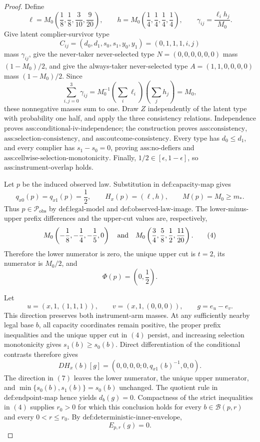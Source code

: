 \documentclass{article}
\begin{document}
\begin{proof}
Define
\[
 \ell=M_0\left(\frac18,\frac18,\frac3{10},\frac9{20}\right),
 \qquad
 h=M_0\left(\frac14,\frac14,\frac14,\frac14\right),
 \qquad
 \gamma_{ij}=\frac{\ell_i h_j}{M_0}.
\tag{1}
\]
Give latent complier-survivor type
\[
 C_{ij}=(d_0,d_1,s_0,s_1,y_0,y_1)=(0,1,1,1,i,j)
\]
mass \(\gamma_{ij}\), give the never-taker never-selected type
\(N=(0,0,0,0,0,0)\) mass \((1-M_0)/2\), and give the always-taker never-selected type \(A=(1,1,0,0,0,0)\) mass \((1-M_0)/2\).  Since
\[
 \sum_{i,j=0}^3\gamma_{ij}
 =M_0^{-1}\left(\sum_i\ell_i\right)\left(\sum_jh_j\right)=M_0,
\tag{2}
\]
these nonnegative masses sum to one.  Draw \(Z\) independently of the latent type with probability one half, and apply the three consistency relations.  Independence proves \(\text{ass:conditional-iv-independence}\); the construction proves \(\text{ass:consistency}\), \(\text{ass:selection-consistency}\), and \(\text{ass:outcome-consistency}\).  Every type has \(d_0\le d_1\), and every complier has \(s_1-s_0=0\), proving \(\text{ass:no-defiers}\) and \(\text{ass:cellwise-selection-monotonicity}\).  Finally, \(1/2\in[\epsilon,1-\epsilon]\), so \(\text{ass:instrument-overlap}\) holds.

Let \(p\) be the induced observed law.  Substitution in \(\text{def:capacity-map}\) gives
\[
 q_{x0}(p)=q_{x1}(p)=\frac12,
 \qquad H_x(p)=(\ell,h),
 \qquad M(p)=M_0\ge m_*.
\tag{3}
\]
Thus \(p\in\mathcal P_{\mathrm{obs}}\) by \(\text{def:legal-model}\) and \(\text{def:observed-law-image}\).  The lower-minus-upper prefix differences and the upper-cut values are, respectively,
\[
 M_0\left(-\frac18,-\frac14,-\frac15,0\right)
 \quad\hbox{and}\quad
 M_0\left(\frac34,\frac58,\frac12,\frac{11}{20}\right).
\tag{4}
\]
Therefore the lower numerator is zero, the unique upper cut is \(t=2\), its numerator is \(M_0/2\), and
\[
 \Phi(p)=\left(0,\frac12\right).
\tag{5}
\]

Let
\[
 u=(x,1,(1,1,1)),\qquad v=(x,1,(0,0,0)),
 \qquad g=e_u-e_v.
\tag{6}
\]
This direction preserves both instrument-arm masses.  At any sufficiently nearby legal base \(b\), all capacity coordinates remain positive, the proper prefix inequalities and the unique upper cut in \((4)\) persist, and increasing selection monotonicity gives \(s_1(b)\ge s_0(b)\).  Direct differentiation of the conditional contrasts therefore gives
\[
 D H_x(b)[g]=(0,0,0,0;0,q_{x1}(b)^{-1},0,0).
\tag{7}
\]
The direction in \((7)\) leaves the lower numerator, the unique upper numerator, and \(\min\{s_0(b),s_1(b)\}=s_0(b)\) unchanged.  The quotient rule in \(\text{def:endpoint-map}\) hence yields \(d_b(g)=0\).  Compactness of the strict inequalities in \((4)\) supplies \(r_0>0\) for which this conclusion holds for every \(b\in\mathcal B(p,r)\) and every \(0<r\le r_0\).  By \(\text{def:deterministic-inner-envelope}\),
\[
 E_{p,r}(g)=0.
\tag{8}
\]


\end{proof}
\end{document}
